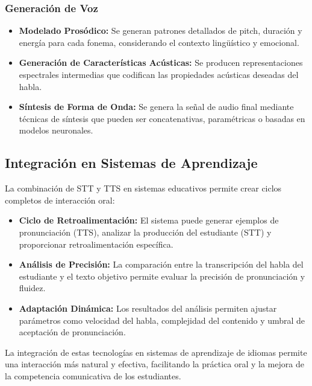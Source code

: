 \subsubsection{Generación de Voz}

\begin{itemize}
  \item \textbf{Modelado Prosódico:} Se generan patrones detallados de pitch, duración y energía para cada fonema, considerando el contexto lingüístico y emocional.

  \item \textbf{Generación de Características Acústicas:} Se producen representaciones espectrales intermedias que codifican las propiedades acústicas deseadas del habla.

  \item \textbf{Síntesis de Forma de Onda:} Se genera la señal de audio final mediante técnicas de síntesis que pueden ser concatenativas, paramétricas o basadas en modelos neuronales.
\end{itemize}

\subsection{Integración en Sistemas de Aprendizaje}

La combinación de STT y TTS en sistemas educativos permite crear ciclos completos de interacción oral:

\begin{itemize}
  \item \textbf{Ciclo de Retroalimentación:} El sistema puede generar ejemplos de pronunciación (TTS), analizar la producción del estudiante (STT) y proporcionar retroalimentación específica.

  \item \textbf{Análisis de Precisión:} La comparación entre la transcripción del habla del estudiante y el texto objetivo permite evaluar la precisión de pronunciación y fluidez.

  \item \textbf{Adaptación Dinámica:} Los resultados del análisis permiten ajustar parámetros como velocidad del habla, complejidad del contenido y umbral de aceptación de pronunciación.
\end{itemize}

La integración de estas tecnologías en sistemas de aprendizaje de idiomas permite una interacción más natural y efectiva, facilitando la práctica oral y la mejora de la competencia comunicativa de los estudiantes.


